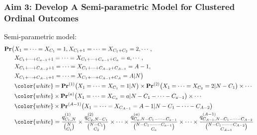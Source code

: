 \documentclass[hyperref={bookmarks=false},aspectratio=169]{beamer}
\begin{document}
\begin{frame}
\frametitle{Aim 3: Develop A Semi-parametric Model for Clustered Ordinal Outcomes}

\alert{Semi-parametric model}:
\begin{equation*}\label{M:SPforOrdinal1}
\begin{split}
    \boldsymbol{\Pr} \big( & X_1 = \dots = X_{C_1} = 1,  X_{C_1 + 1} = \dots = X_{C_1 + C_2} = 2, \cdots, \\
   & X_{C_1 + \dots + C_{a-1} + 1} = \dots = X_{C_1 + \cdots + C_{a-1} +  C_{a}} = a, \cdots, \\
   & X_{C_1 + \dots + C_{A-2} + 1} = \dots = X_{C_1 + \dots + C_{A-2} +  C_{A-1}} = A-1, \\
   & X_{C_1 + \dots + C_{A-1} + 1} = \dots = X_{C_1 + \dots + C_{A-1} +  C_{A}} = A | N \big) \\
   & {\color{white} = {\boldsymbol{\Pr}}^{(1)} \big( X_1 = \dots = X_{C_1} = 1 | N \big) \times {\boldsymbol{\Pr}}^{(2)} \big(X_{1} = \dots = X_{C_2} = 2 | N - C_1\big) \times \cdots }\\
   & {\color{white} \times {\boldsymbol{\Pr}}^{(a)} \big(X_{1} = \dots = X_{C_{a}} = a | N - C_1 - \cdots - C_{a-1} \big) \times \cdots }\\
   & {\color{white} \times {\boldsymbol{\Pr}}^{(A-1)} \big(X_{1} = \dots = X_{C_{A-1}} = A-1 | N - C_1 - \cdots - C_{A-2} \big) } \\
   & {\color{white} = \dfrac{q^{(1)}_{C_1,N}}{\binom{N}{C_1}} \times \dfrac{q^{(2)}_{C_2,N - C_1}}{\binom{N - C_1}{C_2}} \times \cdots \times \dfrac{q^{(a)}_{C_{a},N - C_1 - \cdots - C_{a-1}}}{\binom{N - C_1 - \cdots - C_{a-1}}{C_a}} \times \cdots \times \dfrac{q^{(A-1)}_{C_{A-1},N - C_1 - \cdots - C_{A-2}}}{\binom{N - C_1 - \cdots - C_{A-2}}{C_{A-1}}} }
\end{split}
\end{equation*}

\end{frame}
\end{document}
